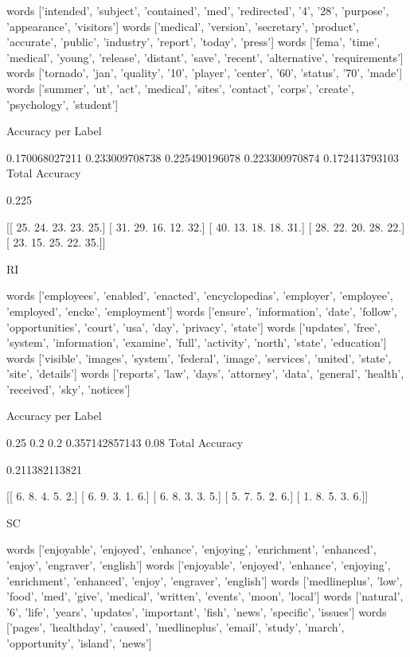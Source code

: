 \documentclass[11pt]{article}
\begin{document}
\begin{verbatium}
words
['intended', 'subject', 'contained', 'med', 'redirected', '4', '28', 'purpose', 'appearance', 'visitors']
words
['medical', 'version', 'secretary', 'product', 'accurate', 'public', 'industry', 'report', 'today', 'press']
words
['fema', 'time', 'medical', 'young', 'release', 'distant', 'save', 'recent', 'alternative', 'requirements']
words
['tornado', 'jan', 'quality', '10', 'player', 'center', '60', 'status', '70', 'made']
words
['summer', 'ut', 'act', 'medical', 'sites', 'contact', 'corps', 'create', 'psychology', 'student']

Accuracy per Label

0.170068027211
0.233009708738
0.225490196078
0.223300970874
0.172413793103
Total Accuracy

0.225


[[ 25.  24.  23.  23.  25.]
 [ 31.  29.  16.  12.  32.]
 [ 40.  13.  18.  18.  31.]
 [ 28.  22.  20.  28.  22.]
 [ 23.  15.  25.  22.  35.]]


RI


words
['employees', 'enabled', 'enacted', 'encyclopedias', 'employer', 'employee', 'employed', 'encke', 'employment']
words
['ensure', 'information', 'date', 'follow', 'opportunities', 'court', 'usa', 'day', 'privacy', 'state']
words
['updates', 'free', 'system', 'information', 'examine', 'full', 'activity', 'north', 'state', 'education']
words
['visible', 'images', 'system', 'federal', 'image', 'services', 'united', 'state', 'site', 'details']
words
['reports', 'law', 'days', 'attorney', 'data', 'general', 'health', 'received', 'sky', 'notices']

Accuracy per Label

0.25
0.2
0.2
0.357142857143
0.08
Total Accuracy

0.211382113821


[[ 6.  8.  4.  5.  2.]
 [ 6.  9.  3.  1.  6.]
 [ 6.  8.  3.  3.  5.]
 [ 5.  7.  5.  2.  6.]
 [ 1.  8.  5.  3.  6.]]


SC


words
['enjoyable', 'enjoyed', 'enhance', 'enjoying', 'enrichment', 'enhanced', 'enjoy', 'engraver', 'english']
words
['enjoyable', 'enjoyed', 'enhance', 'enjoying', 'enrichment', 'enhanced', 'enjoy', 'engraver', 'english']
words
['medlineplus', 'low', 'food', 'med', 'give', 'medical', 'written', 'events', 'moon', 'local']
words
['natural', '6', 'life', 'years', 'updates', 'important', 'fish', 'news', 'specific', 'issues']
words
['pages', 'healthday', 'caused', 'medlineplus', 'email', 'study', 'march', 'opportunity', 'island', 'news']


\end{verbatium}
\end{document}
